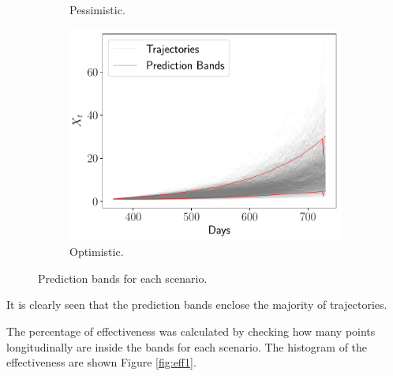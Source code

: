 \documentclass[11pt]{article}
\theoremstyle{definition}
\theoremstyle{remark}
\theoremstyle{remark}
\begin{document}
\begin{figure}
\begin{subfigure}[b]{0.45\textwidth}
      \caption{Pessimistic.}
  \end{subfigure}
  \begin{subfigure}[b]{0.45\textwidth}
      \centering
      \includegraphics[scale=0.45]{bands_optimistic.pdf}
      \caption{Optimistic.}
  \end{subfigure}
  \caption{Prediction bands for each scenario.}
  \label{fig:pb1}
\end{figure}

It is clearly seen that the prediction bands enclose the majority of
trajectories.

The percentage of effectiveness was calculated by checking how many
points longitudinally are inside the bands for each scenario. The
histogram of the effectiveness are shown Figure \ref{fig:eff1}.
\end{document}

